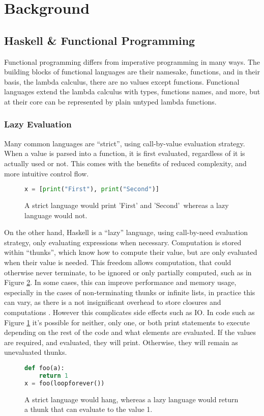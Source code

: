 \section{Background} \label{background}

\subsection{Haskell \& Functional Programming}
Functional programming differs from imperative programming in many ways. The building blocks of functional languages are their namesake, functions, and in their basis, the lambda calculus, there are no values except functions. Functional languages extend the lambda calculus with types, functions names, and more, but at their core can be represented by plain untyped lambda functions.
\subsubsection{Lazy Evaluation}
Many common languages are ``strict'', using call-by-value evaluation strategy. When a value is parsed into a function, it is first evaluated, regardless of it is actually used or not. This comes with the benefits of reduced complexity, and more intuitive control flow.
\begin{figure}[b]
    \centering
\begin{lstlisting}[language=Python]
x = [print("First"), print("Second")]
\end{lstlisting}
    \caption{A strict language would print 'First' and 'Second'\, whereas a lazy language would not.}
    \label{fig:print}
\end{figure}
On the other hand, Haskell is a ``lazy'' language, using call-by-need evaluation strategy, only evaluating expressions when necessary. Computation is stored within ``thunks'', which know how to compute their value, but are only evaluated when their value is needed. This freedom allows computation, that could otherwise never terminate, to be ignored or only partially computed, such as in Figure \ref{fig:strict-lazy}.
In some cases, this can improve performance and memory usage, especially in the cases of non-terminating thunks or infinite lists, in practice this can vary, as there is a not insignificant overhead to store closures and computations \cite{Jones_1992, Efficient_Lazy}.
However this complicates side effects such as IO. In code such as Figure \ref{fig:print} it's possible for neither, only one, or both print statements to execute depending on the rest of the code and what elements are evaluated. If the values are required, and evaluated, they will print. Otherwise, they will remain as unevaluated thunks.
\begin{figure}[t]
    \centering
\begin{lstlisting}[language=Python]
def foo(a):
    return 1
x = foo(loopforever())
\end{lstlisting}
    \caption{A strict language would hang, whereas a lazy language would return a thunk that can evaluate to the value 1.}
    \label{fig:strict-lazy}
\end{figure}

